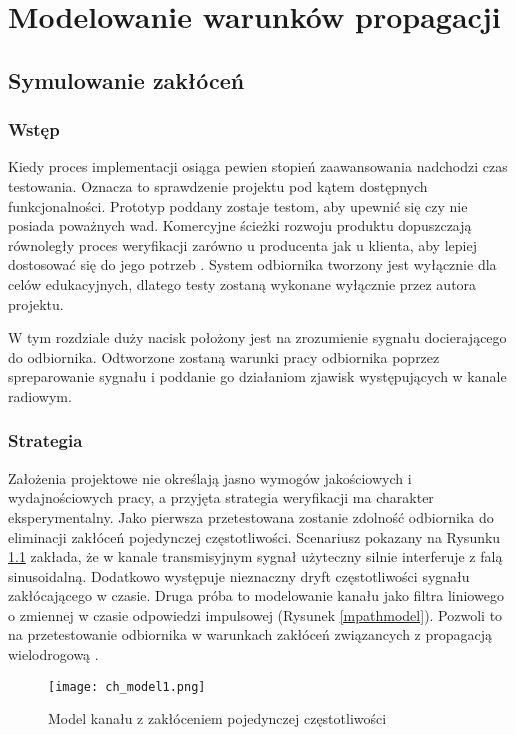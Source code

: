 \chapter{Modelowanie warunków propagacji}
\section{Symulowanie zakłóceń}
\subsection{Wstęp}
Kiedy proces implementacji osiąga pewien stopień zaawansowania nadchodzi czas testowania. 
Oznacza to sprawdzenie projektu pod kątem dostępnych funkcjonalności. 
Prototyp poddany zostaje testom, aby upewnić się czy nie posiada poważnych wad. 
Komercyjne ścieżki rozwoju produktu dopuszczają równoległy proces weryfikacji zarówno u producenta jak u klienta, aby lepiej dostosować się do jego potrzeb \cite{product_dev}. 
System odbiornika tworzony jest wyłącznie dla celów edukacyjnych, dlatego testy zostaną wykonane wyłącznie przez autora projektu. 

W tym rozdziale duży nacisk położony jest na zrozumienie sygnału docierającego do odbiornika. 
Odtworzone zostaną warunki pracy odbiornika poprzez spreparowanie sygnału i poddanie go działaniom zjawisk występujących w kanale radiowym. 
\subsection{Strategia}
Założenia projektowe nie określają jasno wymogów jakościowych i wydajnościowych pracy, a przyjęta strategia weryfikacji ma charakter eksperymentalny. 
Jako pierwsza przetestowana zostanie zdolność odbiornika do eliminacji zakłóceń pojedynczej częstotliwości. 
Scenariusz pokazany na Rysunku \ref{cwmodel} zakłada, że w kanale transmisyjnym sygnał użyteczny silnie interferuje z falą sinusoidalną. 
Dodatkowo występuje nieznaczny dryft częstotliwości sygnału zakłócającego w czasie.
Druga próba to modelowanie kanału jako filtra liniowego o zmiennej w czasie odpowiedzi impulsowej (Rysunek \ref{mpathmodel}). 
Pozwoli to na przetestowanie odbiornika w warunkach zakłóceń związancych z propagacją wielodrogową \cite{indoor_ch_model}.

\begin{figure}[ht]
\centering
\texttt{[image: ch\_model1.png]}
\caption{Model kanału z zakłóceniem pojedynczej częstotliwości}
\label{cwmodel}
\end{figure}

